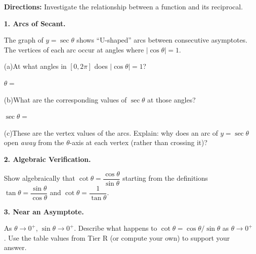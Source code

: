 \documentclass[10pt]{article}
\begin{document}
\begin{tcolorbox}[colback=white, colframe=black!40,
    title=\textbf{Tier E --- Extend},
    fonttitle=\bfseries, arc=2mm, left=3mm, right=3mm, top=2mm, bottom=2mm]

\textbf{Directions:} Investigate the relationship between a function and its
reciprocal.

\vspace{6pt}
\textbf{1. Arcs of Secant.}

The graph of $y = \sec\theta$ shows ``U-shaped'' arcs between consecutive
asymptotes. The vertices of each arc occur at angles where $|\cos\theta| = 1$.

\vspace{4pt}
(a)\quad At what angles in $[0, 2\pi]$ does $|\cos\theta| = 1$?

\vspace{4pt}
$\theta = $ \underline{\hspace{4cm}}

\vspace{4pt}
(b)\quad What are the corresponding values of $\sec\theta$ at those angles?

\vspace{4pt}
$\sec\theta = $ \underline{\hspace{4cm}}

\vspace{4pt}
(c)\quad These are the vertex values of the arcs. Explain: why does an arc of
$y = \sec\theta$ open \emph{away} from the $\theta$-axis at each vertex
(rather than crossing it)?


\vspace{6pt}
\textbf{2. Algebraic Verification.}

Show algebraically that $\cot\theta = \dfrac{\cos\theta}{\sin\theta}$
starting from the definitions $\tan\theta = \dfrac{\sin\theta}{\cos\theta}$
and $\cot\theta = \dfrac{1}{\tan\theta}$.


\vspace{6pt}
\textbf{3. Near an Asymptote.}

As $\theta \to 0^+$, $\sin\theta \to 0^+$. Describe what happens to
$\cot\theta = \cos\theta/\sin\theta$ as $\theta \to 0^+$.
Use the table values from Tier R (or compute your own) to support your answer.


\end{tcolorbox}
\end{document}
